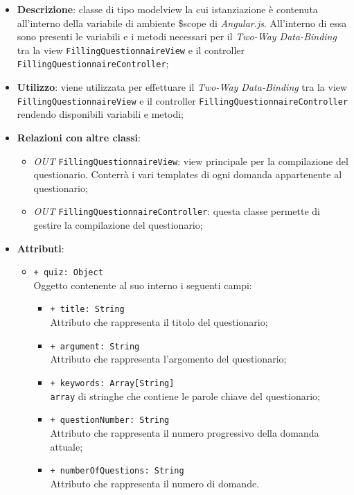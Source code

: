 	\begin{itemize}
		\item \textbf{Descrizione}: classe di tipo modelview la cui istanziazione è contenuta all'interno della variabile di ambiente \$scope di \textit{Angular.js}. All'interno di essa sono presenti le variabili e i metodi necessari per il \textit{Two-Way Data-Binding} tra la view \texttt{FillingQuestionnaireView} e il controller \texttt{FillingQuestionnaireController};
		\item \textbf{Utilizzo}: viene utilizzata per effettuare il \textit{Two-Way Data-Binding} tra la view \texttt{FillingQuestionnaireView} e il controller \texttt{FillingQuestionnaireController} rendendo disponibili variabili e metodi;
		\item \textbf{Relazioni con altre classi}: 
		\begin{itemize}
			\item \textit{OUT} \texttt{FillingQuestionnaireView}: view principale per la compilazione del questionario. Conterrà i vari templates di ogni domanda appartenente al questionario; 
			\item \textit{OUT} \texttt{FillingQuestionnaireController}: questa classe permette di gestire la compilazione del questionario;
		\end{itemize}
		\item \textbf{Attributi}: 
		\begin{itemize}
			\item \texttt{+ quiz: Object} \\ Oggetto contenente al suo interno i seguenti campi:
			\begin{itemize}
				\item \texttt{+ title: String} \\ Attributo che rappresenta il titolo del questionario;
				\item \texttt{+ argument: String} \\ Attributo che rappresenta l'argomento del questionario;
				\item \texttt{+ keywords: Array[String]} \\ \texttt{array} di stringhe che contiene le parole chiave del questionario;
				\item \texttt{+ questionNumber: String} \\ Attributo che rappresenta il numero progressivo della domanda attuale;
				\item \texttt{+ numberOfQuestions: String} \\ Attributo che rappresenta il numero di domande.

\end{itemize}
\end{itemize}
\end{itemize}
